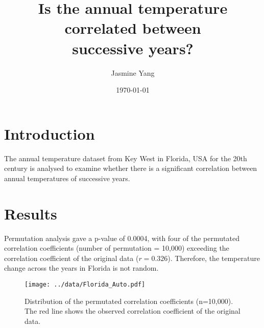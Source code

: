 \documentclass[12pt, a4paper]{article}
\title{Is the annual temperature correlated between \protect\\ successive years?}
\author{Jasmine Yang}
\date{\today}
\begin{document}
  \thispagestyle{empty}  
  \maketitle

  
  \section*{Introduction}
  The annual temperature dataset from Key West in Florida, USA for the 20th century is analysed to examine whether there is a significant correlation between annual temperatures of successive years.
  
  
  \section*{Results}
    Permutation analysis gave a p-value of 0.0004, with four of the permutated correlation coefficients (number of permutation = 10,000) exceeding the correlation coefficient of the original data ($r = 0.326$).
Therefore, the temperature change across the years in Florida is not random.

	\vspace{10mm} %


  \begin{figure}[h]
  \begin{center}
    \texttt{[image: ../data/Florida\_Auto.pdf]}    
    \label{Fig1}
    \caption{Distribution of the permutated correlation coefficients (n=10,000). The red line shows the observed correlation coefficient of the original data.}
  \end{center}
  \end{figure}
\end{document}
